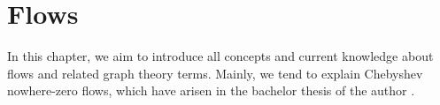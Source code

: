 \chapter{Flows} %

In this chapter, we aim to introduce all concepts and current knowledge about flows and related graph theory terms. Mainly, we tend to explain Chebyshev nowhere-zero flows, which
have arisen in the bachelor thesis of the author \cite{TODO}.
